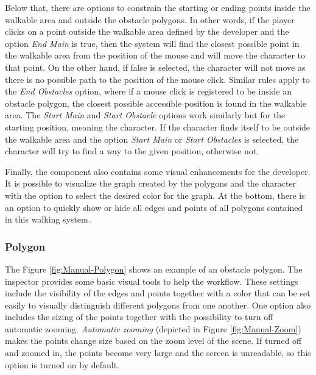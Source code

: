 Below that, there are options to constrain the starting or ending points inside the walkable area and outside the obstacle polygons. In other words, if the player clicks on a point outside the walkable area defined by the developer and the option \textit{End Main} is true, then the system will find the closest possible point in the walkable area from the position of the mouse and will move the character to that point. On the other hand, if false is selected, the character will not move as there is no possible path to the position of the mouse click. Similar rules apply to the \textit{End Obstacles} option, where if a mouse click is registered to be inside an obstacle polygon, the closest possible accessible position is found in the walkable area. The \textit{Start Main} and \textit{Start Obstacle} options work similarly but for the starting position, meaning the character. If the character finds itself to be outside the walkable area and the option \textit{Start Main} or \textit{Start Obstacles} is selected, the character will try to find a way to the given position, otherwise not.

Finally, the component also contains some visual enhancements for the developer. It is possible to visualize the graph created by the polygons and the character with the option to select the desired color for the graph. At the bottom, there is an option to quickly show or hide all edges and points of all polygons contained in this walking system. 

\subsubsection{Polygon}
\label{Manual:Polygon}
The Figure \ref{fig:Manual-Polygon} shows an example of an obstacle polygon. The inspector provides some basic visual tools to help the workflow. These settings include the visibility of the edges and points together with a color that can be set easily to visually distinguish different polygons from one another. One option also includes the sizing of the points together with the possibility to turn off automatic zooming. \textit{Automatic zooming} (depicted in Figure \ref{fig:Manual-Zoom}) makes the points change size based on the zoom level of the scene. If turned off and zoomed in, the points become very large and the screen is unreadable, so this option is turned on by default.


